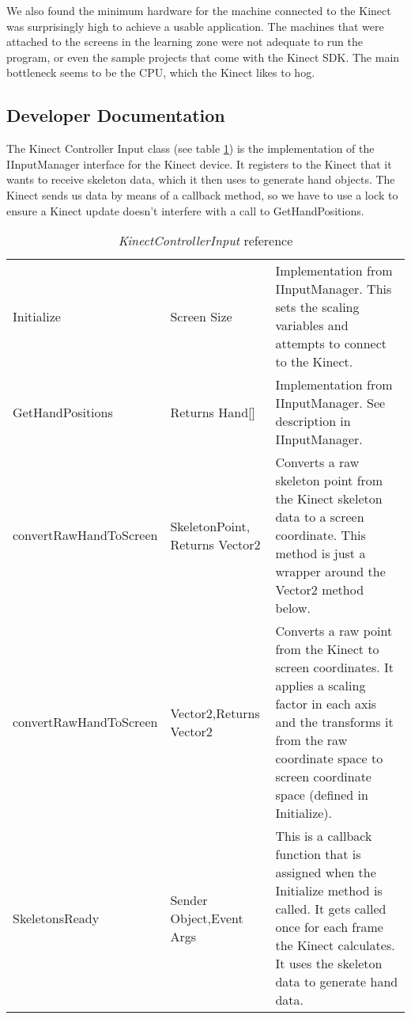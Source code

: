 We also found the minimum hardware for the machine connected to the Kinect was surprisingly high to achieve a usable application.
The machines that were attached to the screens in the learning zone were not adequate to run the program, or even the sample projects that come with the Kinect SDK.
The main bottleneck seems to be the CPU, which the Kinect likes to hog.

\subsection{Developer Documentation}
The Kinect Controller Input class (see table \ref{KinectInputRef}) is the implementation of the IInputManager interface for the Kinect device.
It registers to the Kinect that it wants to receive skeleton data, which it then uses to generate hand objects.
The Kinect sends us data by means of a callback method, so we have to use a lock to ensure a Kinect update doesn't interfere with a call to GetHandPositions.

\begin{table}[h]
\begin{tabular}{|>{\raggedright}p{5cm}|>{\raggedright}p{3.6cm}|>{\raggedright}p{7cm}|}
\hline 
\multicolumn{3}{|c|}{KinectControllerInput}\tabularnewline
\hline 
Initialize & Screen Size & Implementation from IInputManager. This sets the scaling variables
and attempts to connect to the Kinect.\tabularnewline
\hline 
GetHandPositions & Returns Hand{[}{]} & Implementation from IInputManager. See description in IInputManager.\tabularnewline
\hline 
convertRawHandToScreen & SkeletonPoint, Returns Vector2 & Converts a raw skeleton point from the Kinect skeleton data to a screen
coordinate. This method is just a wrapper around the Vector2 method
below.\tabularnewline
\hline 
convertRawHandToScreen & Vector2,\newline Returns Vector2 & Converts a raw point from the Kinect to screen coordinates. It applies
a scaling factor in each axis and the transforms it from the raw coordinate
space to screen coordinate space (defined in Initialize).\tabularnewline
\hline 
SkeletonsReady & Sender Object,\newline Event Args & This is a callback function that is assigned when the Initialize method
is called. It gets called once for each frame the Kinect calculates.
It uses the skeleton data to generate hand data.\tabularnewline
\hline 
\end{tabular}

\caption{\emph{KinectControllerInput} reference}

\label{KinectInputRef}
\end{table}

